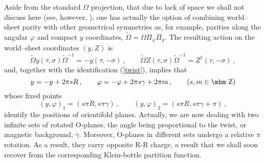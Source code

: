 \documentclass[a4paper,12pt]{article}
\def\bb#1{\hbox{\mbm #1}}
\begin{document}
Aside from the standard $\Omega$ projection, that due to lack of space 
we shall not discuss here (see, however, \cite{adm}), one has 
actually the option
of combining world--sheet parity with other
geometrical symmetries as, for example, parities along the angular 
$\varphi$ and compact $y$ coordinates, $\tilde\Omega = \Omega \Pi_\varphi 
\Pi_y$. The resulting action on the world--sheet coordinates $(y, Z)$ is
\begin{equation} 
\tilde\Omega y (\tau , \sigma ) \tilde\Omega ^{-1}  = - y(\tau , -\sigma) \,,
\qquad \tilde\Omega Z (\tau , \sigma ) \tilde\Omega ^{-1} = Z^\dagger (\tau ,
-\sigma ) \,,
\end{equation}
and, together with the identification (\ref{twist}), implies that 
\begin{equation}
y = - y + 2 \pi s R \,, \qquad \varphi = - \varphi 
+ 2 \pi s \gamma + 2 \pi m \,,
\qquad (s,m \in \bb{Z})
\end{equation}
whose fixed points
\begin{equation}
(y , \varphi )_1 = ( s\pi R , s \pi \gamma ) \,, \qquad 
(y , \varphi )_2 = ( s\pi R , s \pi \gamma + \pi ) \,, \label{fixed}
\end{equation}
identify the positions of orientifold planes. Actually, we are now dealing 
with two infinite sets of rotated O-planes, the angle being proportional 
to the twist, or magnetic background, $\gamma$. Moreover, O-planes in 
different sets undergo a relative $\pi$ rotation. As a result, they carry
opposite R-R charge, a result that we shall soon recover from the 
corresponding Klein-bottle partition function.
\end{document}
